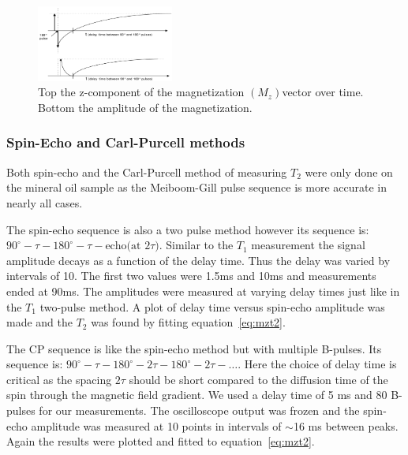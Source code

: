 \documentclass[
reprint,
amsmath,amssymb,
aps,
tikz,
border=5pt
]{revtex4-1}
\begin{document}
    \begin{center}
        \begin{figure}[b]
            \includegraphics[width=0.4\textwidth]{figures/t1_pulse_magnetization.png}
            \caption{Top the z-component of the magnetization $(M_z)$vector over time. Bottom the amplitude of the magnetization.}
            \label{fig:magnetization_t1}
          \end{figure}
    \end{center}

\subsubsection*{Spin-Echo and Carl-Purcell methods}

    Both spin-echo and the Carl-Purcell method of measuring $T_2$ were only done on the mineral oil sample as the Meiboom-Gill pulse sequence is more accurate in nearly all cases.

    The spin-echo sequence is also a two pulse method however its sequence is: $90^{\circ}- \tau  - 180^{\circ}-\tau-\text{echo(at $2\tau$)}$. Similar to the $T_1$ measurement the signal amplitude decays as a function of the delay time. Thus the delay was varied by intervals of 10. The first two values were 1.5ms and 10ms and measurements ended at 90ms. The amplitudes were measured at varying delay times just like in the $T_1$ two-pulse method. A plot of delay time versus spin-echo amplitude was made and the $T_2$ was found by fitting equation~\ref{eq:mzt2}.

    The CP sequence is like the spin-echo method but with multiple B-pulses. Its sequence is: $90^{\circ}- \tau  - 180^{\circ}-2\tau- 180^{\circ}-2\tau- \dots$. Here the choice of delay time is critical as the spacing $2\tau$ should be short compared to the diffusion time of the spin through the magnetic field gradient. We used a delay time of 5 ms and 80 B-pulses for our measurements. The oscilloscope output was frozen and the spin-echo amplitude was measured at 10 points in intervals of $\sim$16 ms between peaks. Again the results were plotted and fitted to equation~\ref{eq:mzt2}.
\end{document}
